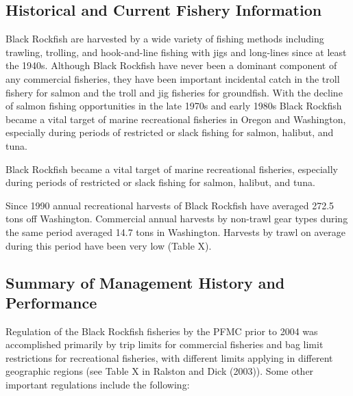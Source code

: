 \documentclass[11pt,
  english,
  letterpaper,
]{article}
\begin{document}
\hypertarget{historical-and-current-fishery-information}{%
\subsection{Historical and Current Fishery Information}\label{historical-and-current-fishery-information}}

Black Rockfish are harvested by a wide variety of fishing methods including trawling, trolling, and hook-and-line fishing with jigs and long-lines since at least the 1940s. Although Black Rockfish have never been a dominant component of any commercial fisheries, they have been important incidental catch in the troll fishery for salmon and the troll and jig fisheries for groundfish. With the decline of salmon fishing opportunities in the late 1970s and early 1980s Black Rockfish became a vital target of marine recreational fisheries in Oregon and Washington, especially during periods of restricted or slack fishing for salmon, halibut, and tuna.

Black Rockfish became a vital target of marine recreational fisheries, especially during periods of restricted or slack fishing for salmon, halibut, and tuna.

Since 1990 annual recreational harvests of Black Rockfish have averaged 272.5 tons off Washington. Commercial annual harvests by non-trawl gear types during the same period averaged 14.7 tons in Washington. Harvests by trawl on average during this period have been very low (Table X).

\hypertarget{summary-of-management-history-and-performance}{%
\subsection{Summary of Management History and Performance}\label{summary-of-management-history-and-performance}}

Regulation of the Black Rockfish fisheries by the PFMC prior to 2004 was accomplished primarily by trip limits for commercial fisheries and bag limit restrictions for recreational fisheries, with different limits applying in different geographic regions (see Table X in Ralston and Dick (2003)). Some other important regulations include the following:
\end{document}
